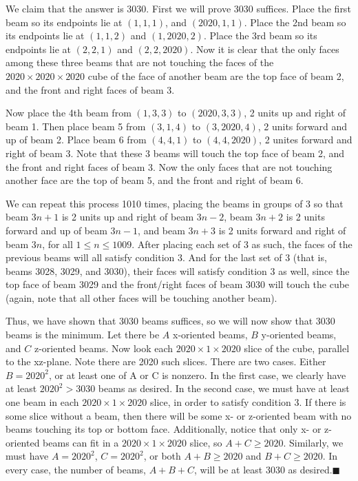 \begin{enumerate}
 We claim that the answer is $\boxed{3030}$. First we will prove 3030 suffices. Place the first beam so its endpoints lie at $(1, 1, 1)$, and $(2020, 1, 1)$. Place the 2nd beam so its endpoints lie at $(1, 1, 2)$ and $(1, 2020, 2)$. Place the 3rd beam so its endpoints lie at $(2, 2, 1)$ and $(2, 2, 2020)$. Now it is clear that the only faces among these three beams that are not touching the faces of the $2020 \times 2020 \times 2020$ cube of the face of another beam are the top face of beam 2, and the front and right faces of beam 3. 

 Now place the 4th beam from $(1, 3, 3)$ to $(2020, 3, 3)$, 2 units up and right of beam 1. Then place beam 5 from $(3, 1, 4)$ to $(3, 2020, 4)$, 2 units forward and up of beam 2. Place beam 6 from $(4, 4, 1)$ to $(4, 4, 2020)$, 2 unites forward and right of beam 3. Note that these 3 beams will touch the top face of beam 2, and the front and right faces of beam 3. Now the only faces that are not touching another face are the top of beam 5, and the front and right of beam 6. 

 We can repeat this process 1010 times, placing the beams in groups of 3 so that beam $3n+1$ is 2 units up and right of beam $3n-2$, beam $3n+2$ is 2 units forward and up of beam $3n-1$, and beam $3n+3$ is 2 units forward and right of beam $3n$, for all $1\leq n \leq 1009$. After placing each set of 3 as such, the faces of the previous beams will all satisfy condition 3. And for the last set of 3 (that is, beams 3028, 3029, and 3030), their faces will satisfy condition 3 as well, since the top face of beam 3029 and the front/right faces of beam 3030 will touch the cube (again, note that all other faces will be touching another beam).

 Thus, we have shown that 3030 beams suffices, so we will now show that 3030 beams is the minimum. Let there be $A$ x-oriented beams, $B$ y-oriented beams, and $C$ z-oriented beams. Now look each $2020 \times 1 \times 2020$ slice of the cube, parallel to the xz-plane. Note there are 2020 such slices. There are two cases. Either $B=2020^2$, or at least one of A or C is nonzero. In the first case, we clearly have at least $2020^2>3030$ beams as desired. In the second case, we must have at least one beam in each $2020 \times 1 \times 2020$ slice, in order to satisfy condition 3. If there is some slice without a beam, then there will be some x- or z-oriented beam with no beams touching its top or bottom face. Additionally, notice that only x- or z-oriented beams can fit in a $2020 \times 1 \times 2020$ slice, so $A+C\geq 2020$. Similarly, we must have $A=2020^2$, $C=2020^2$, or both $A+B\geq 2020$ and $B+C\geq 2020$. In every case, the number of beams, $A+B+C$, will be at least 3030 as desired.$\blacksquare$




\end{enumerate}
